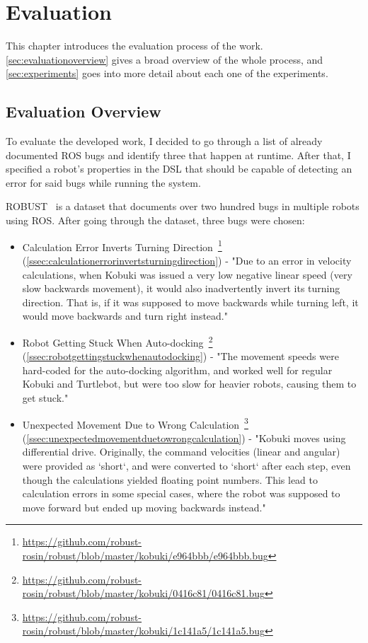 \chapter{Evaluation}
\label{chap:evaluation}

This chapter introduces the evaluation process of the work. \autoref{sec:evaluationoverview} gives a broad overview of the whole process, and \autoref{sec:experiments} goes into more detail about each one of the experiments.


\section{Evaluation Overview}
\label{sec:evaluationoverview}

To evaluate the developed work, I decided to go through a list of already documented ROS bugs and identify three that happen at runtime. After that, I specified a robot's properties in the DSL that should be capable of detecting an error for said bugs while running the system.

ROBUST~\cite{robust} is a dataset that documents over two hundred bugs in multiple robots using ROS. After going through the dataset, three bugs were chosen:

\begin{itemize}
    \item Calculation Error Inverts Turning Direction~\footnote{\url{https://github.com/robust-rosin/robust/blob/master/kobuki/e964bbb/e964bbb.bug}} (\autoref{ssec:calculationerrorinvertsturningdirection}) - "Due to an error in velocity calculations, when Kobuki was issued a very low negative linear speed (very slow backwards movement), it would also inadvertently invert its turning direction. That is, if it was supposed to move backwards while turning left, it would move backwards and turn right instead."
    \item Robot Getting Stuck When Auto-docking~\footnote{\url{https://github.com/robust-rosin/robust/blob/master/kobuki/0416c81/0416c81.bug}} (\autoref{ssec:robotgettingstuckwhenautodocking}) - "The movement speeds were hard-coded for the auto-docking algorithm, and worked well for regular Kobuki and Turtlebot, but were too slow for heavier robots, causing them to get stuck."
    \item Unexpected Movement Due to Wrong Calculation~\footnote{\url{https://github.com/robust-rosin/robust/blob/master/kobuki/1c141a5/1c141a5.bug}} (\autoref{ssec:unexpectedmovementduetowrongcalculation}) - "Kobuki moves using differential drive. Originally, the command velocities (linear and angular) were provided as `short`, and were converted to `short` after each step, even though the calculations yielded floating point numbers. This lead to calculation errors in some special cases, where the robot was supposed to move forward but ended up moving backwards instead."
\end{itemize}


